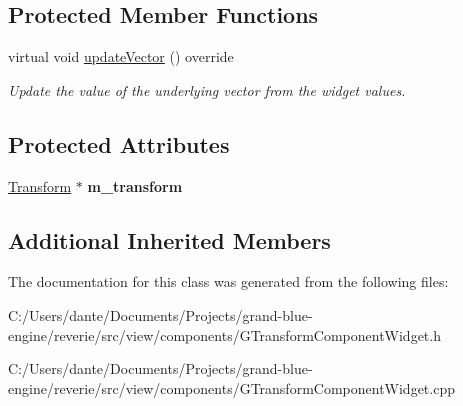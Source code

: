 \subsection*{Protected Member Functions}
\begin{DoxyCompactItemize}
\item 
\mbox{\label{classrev_1_1_view_1_1_translation_widget_a9994d84b2cb38cd1f7cbc13b52da420f}} 
virtual void \mbox{\hyperlink{classrev_1_1_view_1_1_translation_widget_a9994d84b2cb38cd1f7cbc13b52da420f}{update\+Vector}} () override
\begin{DoxyCompactList}\small\item\em Update the value of the underlying vector from the widget values. \end{DoxyCompactList}\end{DoxyCompactItemize}
\subsection*{Protected Attributes}
\begin{DoxyCompactItemize}
\item 
\mbox{\label{classrev_1_1_view_1_1_translation_widget_a7041164728ebb5b68df0916a602aa392}} 
\mbox{\hyperlink{classrev_1_1_transform}{Transform}} $\ast$ {\bfseries m\+\_\+transform}
\end{DoxyCompactItemize}
\subsection*{Additional Inherited Members}


The documentation for this class was generated from the following files\+:\begin{DoxyCompactItemize}
\item 
C\+:/\+Users/dante/\+Documents/\+Projects/grand-\/blue-\/engine/reverie/src/view/components/G\+Transform\+Component\+Widget.\+h\item 
C\+:/\+Users/dante/\+Documents/\+Projects/grand-\/blue-\/engine/reverie/src/view/components/G\+Transform\+Component\+Widget.\+cpp\end{DoxyCompactItemize}
